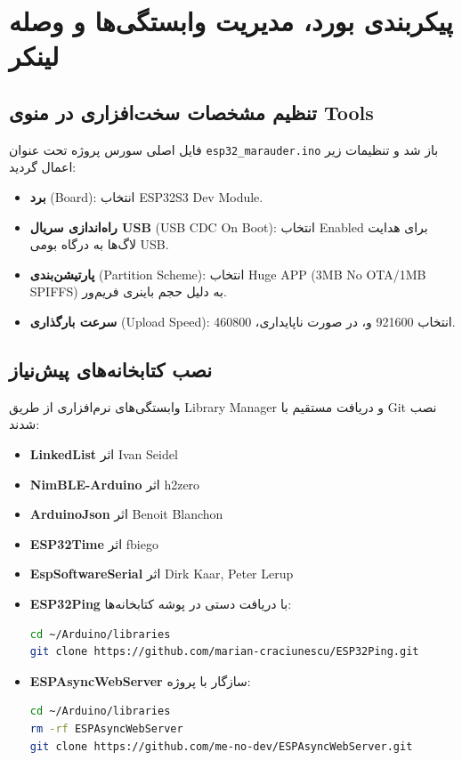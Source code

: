 \documentclass[11pt,a4paper]{article}
\newcommand{\lr}[1]{\foreignlanguage{english}{#1}}
\newenvironment{latin}{\par\beginL\selectlanguage{english}}{\endL\par}
\newcommand{\en}[1]{\lr{#1}}
\begin{document}
\newpage
\section{پیکربندی بورد، مدیریت وابستگی‌ها و وصله لینکر}

\subsection{تنظیم مشخصات سخت‌افزاری در منوی \en{Tools}}
فایل اصلی سورس پروژه تحت عنوان \lr{\texttt{esp32\_marauder.ino}} باز شد و تنظیمات زیر اعمال گردید:
\begin{itemize}
    \item \textbf{برد} \en{(Board)}: انتخاب \en{ESP32S3 Dev Module}.
    \item \textbf{راه‌اندازی سریال USB} \en{(USB CDC On Boot)}: انتخاب \en{Enabled} برای هدایت لاگ‌ها به درگاه بومی \en{USB}.
    \item \textbf{پارتیشن‌بندی} \en{(Partition Scheme)}: انتخاب \en{Huge APP (3MB No OTA/1MB SPIFFS)} به دلیل حجم باینری فریم‌ور.
    \item \textbf{سرعت بارگذاری} \en{(Upload Speed)}: انتخاب \en{921600} و، در صورت ناپایداری، \en{460800}.
\end{itemize}

\subsection{نصب کتابخانه‌های پیش‌نیاز}
وابستگی‌های نرم‌افزاری از طریق \en{Library Manager} و دریافت مستقیم با \en{Git} نصب شدند:
\begin{itemize}
    \item \textbf{LinkedList} اثر \lr{Ivan Seidel}
    \item \textbf{NimBLE-Arduino} اثر \lr{h2zero}
    \item \textbf{ArduinoJson} اثر \lr{Benoit Blanchon}
    \item \textbf{ESP32Time} اثر \lr{fbiego}
    \item \textbf{EspSoftwareSerial} اثر \lr{Dirk Kaar, Peter Lerup}
    \item \textbf{ESP32Ping} با دریافت دستی در پوشه کتابخانه‌ها:
\begin{latin}
\begin{lstlisting}[language=bash]
cd ~/Arduino/libraries
git clone https://github.com/marian-craciunescu/ESP32Ping.git
\end{lstlisting}
\end{latin}
    \item \textbf{ESPAsyncWebServer} سازگار با پروژه:
\begin{latin}
\begin{lstlisting}[language=bash]
cd ~/Arduino/libraries
rm -rf ESPAsyncWebServer
git clone https://github.com/me-no-dev/ESPAsyncWebServer.git
\end{lstlisting}
\end{latin}
\end{itemize}
\end{document}
